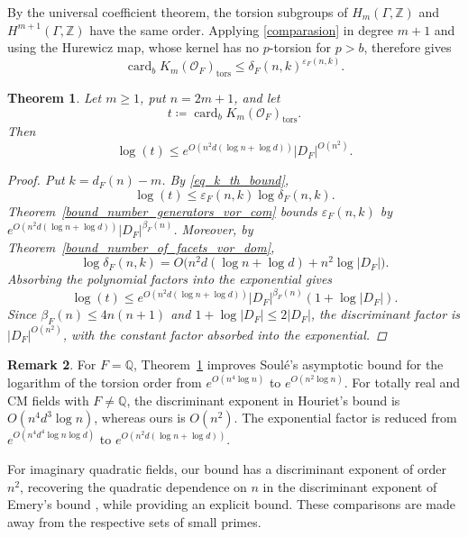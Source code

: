 \documentclass[11pt,a4paper,twoside]{amsart}
\theoremstyle{plain}
\newtheorem{theorem}{\bfseries Theorem}[section]
\theoremstyle{definition}
\newtheorem{remark}[theorem]{\bfseries Remark}
\newcommand{\rint}[0]{\mathcal{O}_F}
\newcommand{\disc}[0]{D_F}
\renewcommand{\leq}{\leqslant}
\renewcommand{\geq}{\geqslant}
\begin{document}
By the universal coefficient theorem, the torsion
subgroups of $H_m(\Gamma,\mathbb{Z})$ and
$H^{m+1}(\Gamma,\mathbb{Z})$ have the same order.
Applying \eqref{comparasion} in degree $m+1$ and using the Hurewicz map, whose kernel has no $p$-torsion for $p>b$, therefore gives
\begin{equation}
\label{eq_k_th_bound}
\operatorname{card}_b K_m(\rint)_{\mathrm{tors}}
\leq \delta_F(n,k)^{\varepsilon_F(n,k)}.
\end{equation}

\begin{theorem}
\label{k-bounds}
Let $m\geq1$, put $n=2m+1$, and let
$$t\coloneqq\operatorname{card}_{b} K_m(\rint)_{\mathrm{tors}}.$$
Then
$$\log(t)\leq e^{O(n^2d(\log n+\log d))}|\disc|^{O(n^2)}.$$
\begin{proof}
Put $k=d_F(n)-m$. By \eqref{eq_k_th_bound},
$$\log(t)\leq\varepsilon_F(n,k)\log\delta_F(n,k).$$
Theorem~\ref{bound_number_generators_vor_com} bounds $\varepsilon_F(n,k)$ by $e^{O(n^2d(\log n+\log d))}|\disc|^{\beta_F(n)}$. Moreover, by Theorem~\ref{bound_number_of_facets_vor_dom},
$$\log\delta_F(n,k)=O\bigl(n^2d(\log n+\log d)+n^2\log|\disc|\bigr).$$
Absorbing the polynomial factors into the exponential gives
$$\log(t)\leq e^{O(n^2d(\log n+\log d))}|\disc|^{\beta_F(n)}(1+\log|\disc|).$$
Since $\beta_F(n)\leq4n(n+1)$ and $1+\log|\disc|\leq2|\disc|$, the discriminant factor is $|\disc|^{O(n^2)}$, with the constant factor absorbed into the exponential.
\end{proof}
\end{theorem}

\begin{remark}
For $F=\mathbb Q$, Theorem~\ref{k-bounds} improves Soulé's asymptotic bound
\cite{soule_bounds} for the logarithm of the torsion order from
$e^{O(n^4\log n)}$ to $e^{O(n^2\log n)}$.
For totally real and CM fields with $F\neq\mathbb Q$, the discriminant
exponent in Houriet's bound \cite[Theorem~4.3]{Juliet_PHD} is
$O(n^4d^3\log n)$, whereas ours is $O(n^2)$.
The exponential factor is reduced from $e^{O(n^4d^4\log n\log d)}$
to $e^{O(n^2d(\log n+\log d))}$.

For imaginary quadratic fields, our bound has a discriminant exponent
of order $n^2$, recovering the quadratic dependence on $n$ in the
discriminant exponent of Emery's bound
\cite[Proposition~4.1]{Emery_imaginary_quad}, while providing an explicit
bound. These comparisons are made away from the respective sets of
small primes.
\end{remark}
\end{document}
